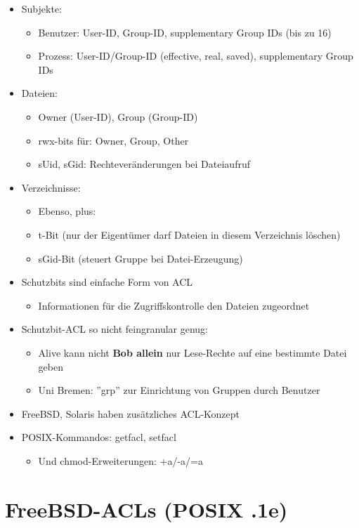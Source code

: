 \documentclass[openany]{book}
\begin{document}
\begin{itemize}
\item Subjekte:
\begin{itemize}
\item Benutzer: User-ID, Group-ID, supplementary Group IDs (bis zu 16)
\item Prozess: User-ID/Group-ID (effective, real, saved), supplementary Group IDs
\end{itemize}
\item Dateien:
\begin{itemize}
\item Owner (User-ID), Group (Group-ID)
\item rwx-bits für: Owner, Group, Other
\item sUid, sGid: Rechteveränderungen bei Dateiaufruf
\end{itemize}
\item Verzeichnisse:
\begin{itemize}
\item Ebenso, plus:
\item t-Bit (nur der Eigentümer darf Dateien in diesem Verzeichnis löschen)
\item sGid-Bit (steuert Gruppe bei Datei-Erzeugung)
\end{itemize}
\item Schutzbits sind einfache Form von ACL
\begin{itemize}
\item Informationen für die Zugriffskontrolle den Dateien zugeordnet
\end{itemize}
\item Schutzbit-ACL so nicht feingranular genug:
\begin{itemize}
\item Alive kann nicht \textbf{Bob allein} nur Lese-Rechte auf eine bestimmte Datei geben
\item Uni Bremen: ''grp'' zur Einrichtung von Gruppen durch Benutzer
\end{itemize}
\item FreeBSD, Solaris haben zusätzliches ACL-Konzept
\item POSIX-Kommandos: getfacl, setfacl
\begin{itemize}
\item Und chmod-Erweiterungen: +a/-a/=a
\end{itemize}
\end{itemize}

\newpage

\section{FreeBSD-ACLs (POSIX .1e)}
\end{document}
